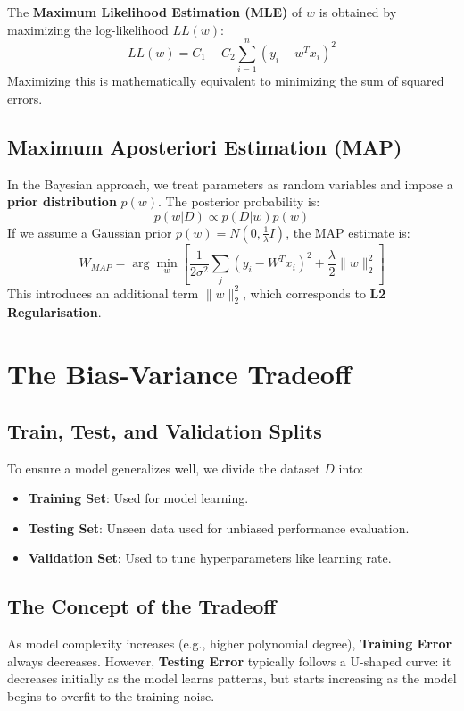 \documentclass[11pt,fleqn]{book}
\begin{document}
The \textbf{Maximum Likelihood Estimation (MLE)} of $w$ is obtained by maximizing the log-likelihood $LL(w)$:
\[LL(w) = C_1 - C_2 \sum_{i=1}^{n}(y_i - w^Tx_i)^2\]
Maximizing this is mathematically equivalent to minimizing the sum of squared errors.

\section{Maximum Aposteriori Estimation (MAP)}
In the Bayesian approach, we treat parameters as random variables and impose a \textbf{prior distribution} $p(w)$. The posterior probability is:
\[p(w|D) \propto p(D|w)p(w)\]
If we assume a Gaussian prior $p(w) = N(0, \frac{1}{\lambda} I)$, the MAP estimate is:
\[W_{MAP} = \arg\min_{w} \left[ \frac{1}{2\sigma^2} \sum_{j}(y_i-W^Tx_i)^2 + \frac{\lambda}{2} \|w\|_2^2 \right]\]
This introduces an additional term $\|w\|_2^2$, which corresponds to \textbf{L2 Regularisation}.

\chapter{The Bias-Variance Tradeoff}

\section{Train, Test, and Validation Splits}
To ensure a model generalizes well, we divide the dataset $D$ into:
\begin{itemize}
    \item \textbf{Training Set}: Used for model learning.
    \item \textbf{Testing Set}: Unseen data used for unbiased performance evaluation.
    \item \textbf{Validation Set}: Used to tune hyperparameters like learning rate.
\end{itemize}

\section{The Concept of the Tradeoff}
As model complexity increases (e.g., higher polynomial degree), \textbf{Training Error} always decreases. However, \textbf{Testing Error} typically follows a U-shaped curve: it decreases initially as the model learns patterns, but starts increasing as the model begins to overfit to the training noise.
\end{document}
